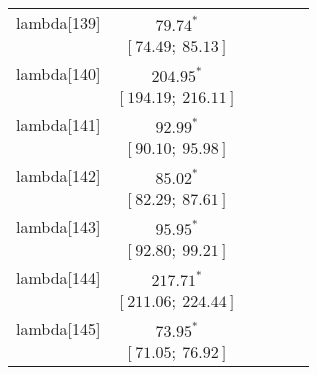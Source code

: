 \begin{table}
\begin{center}
\begin{tabular}{l c c c c c }
lambda[139] & $79.74^{*}$                      &                           &                           &                         &                         \\
            & $[74.49;\ 85.13]$                &                           &                           &                         &                         \\
lambda[140] & $204.95^{*}$                     &                           &                           &                         &                         \\
            & $[194.19;\ 216.11]$              &                           &                           &                         &                         \\
lambda[141] & $92.99^{*}$                      &                           &                           &                         &                         \\
            & $[90.10;\ 95.98]$                &                           &                           &                         &                         \\
lambda[142] & $85.02^{*}$                      &                           &                           &                         &                         \\
            & $[82.29;\ 87.61]$                &                           &                           &                         &                         \\
lambda[143] & $95.95^{*}$                      &                           &                           &                         &                         \\
            & $[92.80;\ 99.21]$                &                           &                           &                         &                         \\
lambda[144] & $217.71^{*}$                     &                           &                           &                         &                         \\
            & $[211.06;\ 224.44]$              &                           &                           &                         &                         \\
lambda[145] & $73.95^{*}$                      &                           &                           &                         &                         \\
            & $[71.05;\ 76.92]$                &                           &                           &                         &                         \\

\end{tabular}
\end{center}
\end{table}

